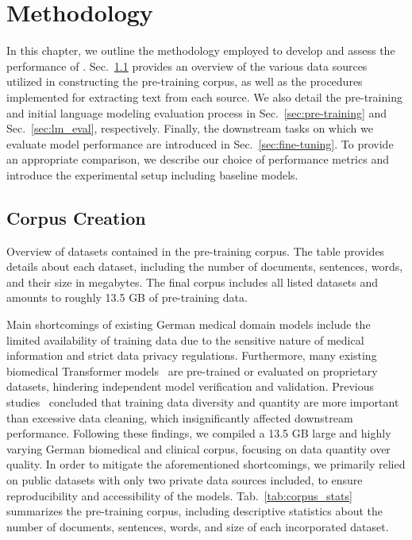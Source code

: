 \chapter{Methodology} \label{chap:methodology}

In this chapter, we outline the methodology employed to develop and assess the
performance of \ChristBERT{}. Sec.~\ref{sec:corpus} provides an overview of the
various data sources utilized in constructing the pre-training corpus, as well
as the procedures implemented for extracting text from each source. We also
detail the pre-training and initial language modeling evaluation process in
Sec.~\ref{sec:pre-training} and Sec.~\ref{sec:lm_eval}, respectively. Finally,
the downstream tasks on which we evaluate model performance are introduced in
Sec.~\ref{sec:fine-tuning}. To provide an appropriate comparison, we describe
our choice of performance metrics and introduce the experimental setup including
baseline models. 

\section{Corpus Creation} \label{sec:corpus}

\begin{table}[htb]
    \centering
    
    \caption[Overview of datasets contained in the pre-training corpus]{
        Overview of datasets contained in the pre-training corpus. The table
        provides details about each dataset, including the number of documents,
        sentences, words, and their size in megabytes. The final corpus includes
        all listed datasets and amounts to roughly 13.5 GB of pre-training
        data.}
    \label{tab:corpus_stats}
\end{table}

Main shortcomings of existing German medical domain models include the limited
availability of training data due to the sensitive nature of medical information
and strict data privacy regulations. Furthermore, many existing biomedical
Transformer models~\cite{lentzen2022critical, bressem2024medbert} are
pre-trained or evaluated on proprietary datasets, hindering independent model
verification and validation. Previous studies~\cite{martin2020camembert,
dada2023impact, bressem2024medbert} concluded that training data diversity and
quantity are more important than excessive data cleaning, which insignificantly
affected downstream performance. Following these findings, we compiled a 13.5 GB
large and highly varying German biomedical and clinical corpus, focusing on data
quantity over quality. In order to mitigate the aforementioned shortcomings, we
primarily relied on public datasets with only two private data sources included,
to ensure reproducibility and accessibility of the \ChristBERT{} models.
Tab.~\ref{tab:corpus_stats} summarizes the pre-training corpus, including
descriptive statistics about the number of documents, sentences, words, and size
of each incorporated dataset.

